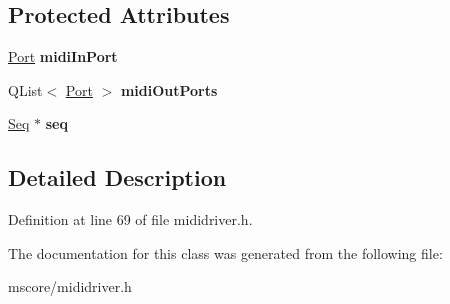 \subsection*{Protected Attributes}
\begin{DoxyCompactItemize}
\item 
\mbox{\label{class_ms_1_1_midi_driver_a2df3307198ae1e10a3363754c5b14f5b}} 
\hyperlink{class_ms_1_1_port}{Port} {\bfseries midi\+In\+Port}
\item 
\mbox{\label{class_ms_1_1_midi_driver_a6b763163f0b29dc502d96be2a14cad0f}} 
Q\+List$<$ \hyperlink{class_ms_1_1_port}{Port} $>$ {\bfseries midi\+Out\+Ports}
\item 
\mbox{\label{class_ms_1_1_midi_driver_a9b3fe38be89b737da01649a0df451e90}} 
\hyperlink{class_ms_1_1_seq}{Seq} $\ast$ {\bfseries seq}
\end{DoxyCompactItemize}


\subsection{Detailed Description}


Definition at line 69 of file mididriver.\+h.



The documentation for this class was generated from the following file\+:\begin{DoxyCompactItemize}
\item 
mscore/mididriver.\+h\end{DoxyCompactItemize}
